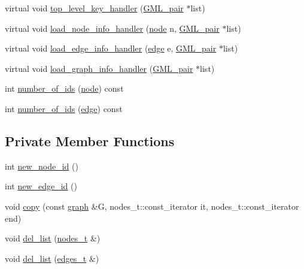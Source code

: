 \begin{DoxyCompactItemize}
virtual void \mbox{\hyperlink{classgraph_a33bc9b45f0d4738c491535147b703cc5}{top\+\_\+level\+\_\+key\+\_\+handler}} (\mbox{\hyperlink{struct_g_m_l__pair}{G\+M\+L\+\_\+pair}} $\ast$list)
\item 
virtual void \mbox{\hyperlink{classgraph_ae956c361413410987a54e2296af2572f}{load\+\_\+node\+\_\+info\+\_\+handler}} (\mbox{\hyperlink{classnode}{node}} n, \mbox{\hyperlink{struct_g_m_l__pair}{G\+M\+L\+\_\+pair}} $\ast$list)
\item 
virtual void \mbox{\hyperlink{classgraph_ad049a2f8c191a7dc359e684ef56304d1}{load\+\_\+edge\+\_\+info\+\_\+handler}} (\mbox{\hyperlink{classedge}{edge}} e, \mbox{\hyperlink{struct_g_m_l__pair}{G\+M\+L\+\_\+pair}} $\ast$list)
\item 
virtual void \mbox{\hyperlink{classgraph_aaca9ede8005388fd22b56e12280bf1bf}{load\+\_\+graph\+\_\+info\+\_\+handler}} (\mbox{\hyperlink{struct_g_m_l__pair}{G\+M\+L\+\_\+pair}} $\ast$list)
\item 
int \mbox{\hyperlink{classgraph_a82f09714f50dbe41e1a9cbcb12ad0866}{number\+\_\+of\+\_\+ids}} (\mbox{\hyperlink{classnode}{node}}) const
\item 
int \mbox{\hyperlink{classgraph_a8db97e43b31c95ac6b0bd1820aa5224b}{number\+\_\+of\+\_\+ids}} (\mbox{\hyperlink{classedge}{edge}}) const
\end{DoxyCompactItemize}
\subsection*{Private Member Functions}
\begin{DoxyCompactItemize}
\item 
int \mbox{\hyperlink{classgraph_a4c9af44fa03250994dd1dd972bd7cdfc}{new\+\_\+node\+\_\+id}} ()
\item 
int \mbox{\hyperlink{classgraph_a3f3121c481746ab0a19eb187da5c0246}{new\+\_\+edge\+\_\+id}} ()
\item 
void \mbox{\hyperlink{classgraph_abc39d65a6ca3f3165bc71c7125dfd22e}{copy}} (const \mbox{\hyperlink{classgraph}{graph}} \&G, nodes\+\_\+t\+::const\+\_\+iterator it, nodes\+\_\+t\+::const\+\_\+iterator end)
\item 
void \mbox{\hyperlink{classgraph_a23f0a5fb311b7d71bb9dfc4e8aedef35}{del\+\_\+list}} (\mbox{\hyperlink{edge_8h_a22ac17689106ba21a84e7bc54d1199d6}{nodes\+\_\+t}} \&)
\item 
void \mbox{\hyperlink{classgraph_a917feb07885dee30897d19691e1a7002}{del\+\_\+list}} (\mbox{\hyperlink{edge_8h_a8f9587479bda6cf612c103494b3858e3}{edges\+\_\+t}} \&)
\end{DoxyCompactItemize}
